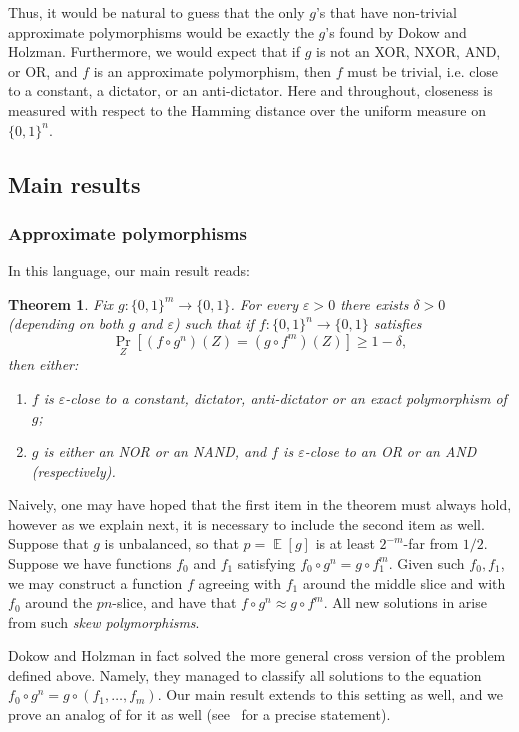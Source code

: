 \documentclass{article}
\newtheorem{theorem}{Theorem}[section]
\theoremstyle{definition}
\theoremstyle{remark}
\DeclareMathOperator*{\E}{\mathbb{E}}
\newcommand\eps{\varepsilon}
\renewcommand\epsilon{\eps}
\renewcommand\geq{\geqslant}
\begin{document}
Thus, it would be natural to guess that the only $g$'s that have non-trivial approximate polymorphisms would be exactly the $g$'s found by Dokow and Holzman.
Furthermore, we would expect that if $g$ is not an XOR, NXOR, AND, or OR, and 
$f$ is an approximate polymorphism, then $f$ must be trivial, i.e. close to a constant, a dictator, or an anti-dictator. Here and throughout, closeness is 
measured with respect to the Hamming distance over the uniform measure on
$\{0,1\}^n$. 

\subsection{Main results}
\subsubsection{Approximate polymorphisms}
In this language, our main result reads:
\begin{theorem} \label{thm:main-intro}
Fix $g\colon \{0,1\}^m \to \{0,1\}$. For every $\epsilon > 0$ there exists $\delta > 0$ (depending on both $g$ and $\epsilon$) such that if $f\colon \{0,1\}^n \to \{0,1\}$ satisfies
\[
 \Pr_Z[(f \circ g^{n})(Z) = (g \circ f^{m})(Z)] \geq 1-\delta,
\]
then either:
\begin{enumerate}
    \item $f$ is $\eps$-close to a constant, dictator, anti-dictator or an exact polymorphism of $g$;
    \item $g$ is either an NOR or an NAND, and $f$ is $\eps$-close to an OR or an AND (respectively).
\end{enumerate}
\end{theorem}
Naively, one may have hoped that the first item in the theorem must always hold, 
however as we explain next, it is necessary to include the second item as well. Suppose that $g$ is unbalanced, so that $p = \E[g]$ is at least $2^{-m}$-far from $1/2$. Suppose we have functions $f_0$ and $f_1$ satisfying 
$f_0 \circ g^{n} = g \circ f_1^{m}$. Given such $f_0, f_1$, we may construct a function $f$ agreeing with $f_1$ around the middle slice and with $f_0$ around the $pn$-slice, and have that $f \circ g^{n} \approx g \circ f^m$. All new solutions in  arise from such \emph{skew polymorphisms}.

\smallskip

Dokow and Holzman in fact solved the more general cross version of the problem defined above. Namely, they managed to classify all solutions to the equation
$ f_0 \circ g^{n} = g \circ (f_1,\ldots,f_m)$. Our main result extends 
to this setting as well, and we prove an analog of  for it 
as well (see~ for a precise statement).
\end{document}
